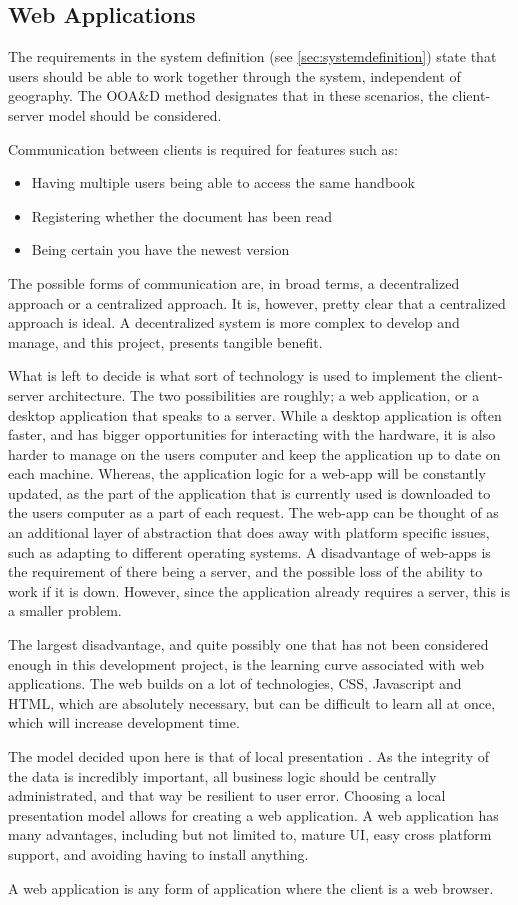 \subsection{Web Applications}
The requirements in the system definition (see \cref{sec:systemdefinition}) state that users should be able to work together through the system, independent of geography.
The OOA\&D method designates that in these scenarios, the client-server model should be considered. \citep[p.~202]{Rod-Aalborg}

Communication between clients is required for features such as:
\begin{itemize}
\item Having multiple users being able to access the same handbook
\item Registering whether the document has been read
\item Being certain you have the newest version
\end{itemize}

The possible forms of communication are, in broad terms, a decentralized approach or a centralized approach.
It is, however, pretty clear that a centralized approach is ideal.
A decentralized system is more complex to develop and manage, and this project, presents tangible benefit.

What is left to decide is what sort of technology is used to implement the client-server architecture.
The two possibilities are roughly; a web application, or a desktop application that speaks to a server.
While a desktop application is often faster, and has bigger opportunities for interacting with the hardware, it is also harder to manage on the users computer and keep the application up to date on each machine.
Whereas, the application logic for a web-app will be constantly updated, as the part of the application that is currently used is downloaded to the users computer as a part of each request.
The web-app can be thought of as an additional layer of abstraction that does away with platform specific issues, such as adapting to different operating systems.
A disadvantage of web-apps is the requirement of there being a server, and the possible loss of the ability to work if it is down.
However, since the application already requires a server, this is a smaller problem.

The largest disadvantage, and quite possibly one that has not been considered enough in this development project, is the learning curve associated with web applications.
The web builds on a lot of technologies, CSS, Javascript and HTML, which are absolutely necessary, but can be difficult to learn all at once, which will increase development time.

The model decided upon here is that of local presentation \citep[p.~202]{Rod-Aalborg}.
As the integrity of the data is incredibly important, all business logic should be centrally administrated, and that way be resilient to user error.
Choosing a local presentation model allows for creating a web application.
A web application has many advantages, including but not limited to, mature UI, easy cross platform support, and avoiding having to install anything.

A web application is any form of application where the client is a web browser.
